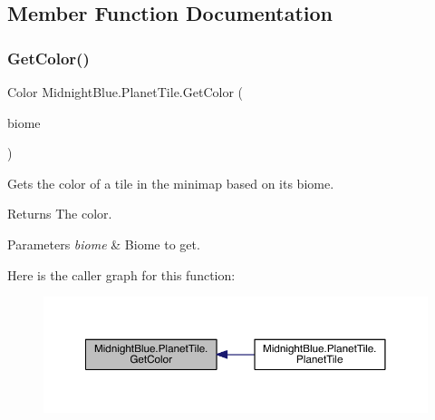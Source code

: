 \subsection{Member Function Documentation}
\hypertarget{class_midnight_blue_1_1_planet_tile_a0efc70f73aaf5a252cfe6b96deb9aa22}{}\label{class_midnight_blue_1_1_planet_tile_a0efc70f73aaf5a252cfe6b96deb9aa22} 
\subsubsection{\texorpdfstring{Get\+Color()}{GetColor()}}
{\footnotesize\ttfamily Color Midnight\+Blue.\+Planet\+Tile.\+Get\+Color (\begin{DoxyParamCaption}\item[{\hyperlink{namespace_midnight_blue_a8a6ba5637b64c3eb991f00d48decf381}{Biome}}]{biome }\end{DoxyParamCaption})\hspace{0.3cm}{\ttfamily [inline]}}



Gets the color of a tile in the minimap based on its biome. 

\begin{DoxyReturn}{Returns}
The color.
\end{DoxyReturn}

\begin{DoxyParams}{Parameters}
{\em biome} & Biome to get.\\
\hline
\end{DoxyParams}
Here is the caller graph for this function\+:
\nopagebreak
\begin{figure}[H]
\begin{center}
\leavevmode
\includegraphics[width=350pt]{class_midnight_blue_1_1_planet_tile_a0efc70f73aaf5a252cfe6b96deb9aa22_icgraph}
\end{center}
\end{figure}
\hypertarget{class_midnight_blue_1_1_planet_tile_a0ba5d9886790e8f8d9e54e1873d5565b}{}\label{class_midnight_blue_1_1_planet_tile_a0ba5d9886790e8f8d9e54e1873d5565b} 
